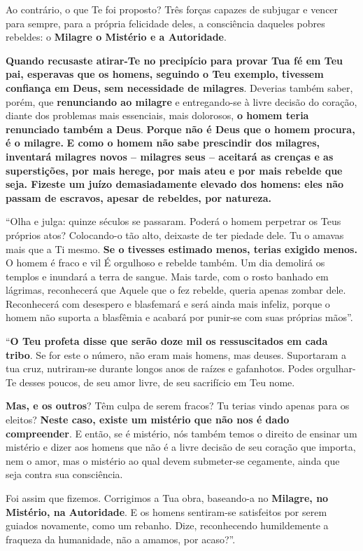 Ao contrário, o que Te foi proposto? Três forças capazes de subjugar e
vencer para sempre, para a própria felicidade deles, a consciência
daqueles pobres rebeldes: o \textbf{Milagre o Mistério e a Autoridade}.

\textbf{Quando recusaste atirar-Te no precipício para provar Tua fé em
Teu pai, esperavas que os homens, seguindo o Teu exemplo, tivessem
confiança em Deus, sem necessidade de milagres}. Deverias também saber,
porém, que \textbf{renunciando ao milagre} e entregando-se à livre
decisão do coração, diante dos problemas mais essenciais, mais
dolorosos, \textbf{o homem teria renunciado também a Deus}.
\textbf{Porque não é Deus que o homem procura, é o milagre.} \textbf{E
como o homem não sabe prescindir dos milagres, inventará milagres novos
-- milagres seus -- aceitará as crenças e as superstições, por mais
herege, por mais ateu e por mais rebelde que seja. Fizeste um juízo
demasiadamente elevado dos homens: eles não passam de escravos, apesar
de rebeldes, por natureza.}

``Olha e julga: quinze séculos se passaram. Poderá o homem perpetrar os
Teus próprios atos? Colocando-o tão alto, deixaste de ter piedade dele.
Tu o amavas mais que a Ti mesmo. \textbf{Se o tivesses estimado menos,
terias exigido menos.} O homem é fraco e vil É orgulhoso e rebelde
também. Um dia demolirá os templos e inundará a terra de sangue. Mais
tarde, com o rosto banhado em lágrimas, reconhecerá que Aquele que o fez
rebelde, queria apenas zombar dele. Reconhecerá com desespero e
blasfemará e será ainda mais infeliz, porque o homem não suporta a
blasfêmia e acabará por punir-se com suas próprias mãos''.

``\textbf{O Teu profeta disse que serão doze mil os ressuscitados em
cada tribo}. Se for este o número, não eram mais homens, mas deuses.
Suportaram a tua cruz, nutriram-se durante longos anos de raízes e
gafanhotos. Podes orgulhar-Te desses poucos, de seu amor livre, de seu
sacrifício em Teu nome.

\textbf{Mas, e os outros}? Têm culpa de serem fracos? Tu terias vindo
apenas para os eleitos? \textbf{Neste caso, existe um mistério que não
nos é dado compreender}. E então, se é mistério, nós também temos o
direito de ensinar um mistério e dizer aos homens que não é a livre
decisão de seu coração que importa, nem o amor, mas o mistério ao qual
devem submeter-se cegamente, ainda que seja contra sua consciência.

Foi assim que fizemos. Corrigimos a Tua obra, baseando-a no
\textbf{Milagre, no} \textbf{Mistério, na Autoridade}. E os homens
sentiram-se satisfeitos por serem guiados novamente, como um rebanho.
Dize, reconhecendo humildemente a fraqueza da humanidade, não a amamos,
por acaso?''.

